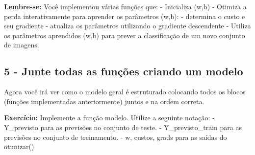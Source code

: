 \documentclass[11pt]{article}
\begin{document}
     \textbf{Lembre-se:} Você implementou várias funções que: - Inicializa
(w,b) - Otimiza a perda interativamente para aprender os parâmetros
(w,b): - determina o custo e seu gradiente - atualiza os parâmetros
utilizando o gradiente descendente - Utiliza os parâmetros aprendidos
(w,b) para prever a classificação de um novo conjunto de imagens.

    \subsection{5 - Junte todas as funções criando um
modelo}\label{junte-todas-as-funuxe7uxf5es-criando-um-modelo}

Agora você irá ver como o modelo geral é estruturado colocando todos os
blocos (funções implementadas anteriormente) juntos e na ordem correta.

\textbf{Exercício:} Implemente a função modelo. Utilize a seguinte
notação: - Y\_previsto para as previsões no conjunto de teste. -
Y\_previsto\_train para as previsões no conjunto de treinamento. - w,
custos, grads para as saídas do otimizar()
\end{document}

